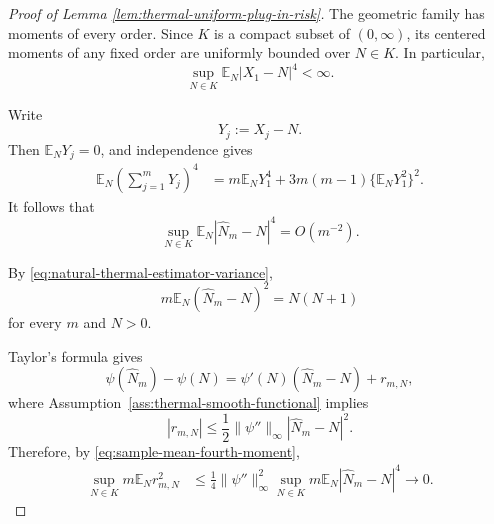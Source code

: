 \documentclass{article}
\theoremstyle{named}
\theoremstyle{named1}
\newcommand{\E}{\mathbb{E}}
\theoremstyle{plain}
\theoremstyle{remark}
\begin{document}
\begin{proof}[Proof of Lemma \ref{lem:thermal-uniform-plug-in-risk}]
The geometric family has moments of every order.
Since \(K\) is a compact subset of \((0,\infty)\), its centered moments of any fixed order are
uniformly bounded over \(N\in K\). In particular,
\begin{equation}
    \sup_{N\in K}
    \E_N|X_1-N|^4
    <
    \infty.
    \label{eq:uniform-geometric-fourth-moment}
\end{equation}

Write
\[
    Y_j:=X_j-N.
\]
Then \(\E_NY_j=0\), and independence gives
\begin{align}
    \E_N
    \left(
        \sum_{j=1}^mY_j
    \right)^4
    &=
    m\E_NY_1^4
    +
    3m(m-1)
    \{\E_NY_1^2\}^2.
    \label{eq:fourth-moment-independent-sum}
\end{align}
It follows that
\begin{equation}
    \sup_{N\in K}
    \E_N|\widehat N_m-N|^4
    =
    O(m^{-2}).
    \label{eq:sample-mean-fourth-moment}
\end{equation}

By \eqref{eq:natural-thermal-estimator-variance},
\begin{equation}
    m\E_N(\widehat N_m-N)^2
    =
    N(N+1)
    \label{eq:thermal-exact-second-moment}
\end{equation}
for every \(m\) and \(N>0\).

Taylor's formula gives
\begin{equation}
    \psi(\widehat N_m)-\psi(N)
    =
    \psi'(N)(\widehat N_m-N)
    +
    r_{m,N},
    \label{eq:thermal-functional-taylor}
\end{equation}
where Assumption~\ref{ass:thermal-smooth-functional} implies
\begin{equation}
    |r_{m,N}|
    \leq
    \frac12
    \|\psi''\|_\infty
    |\widehat N_m-N|^2.
    \label{eq:thermal-taylor-remainder-bound}
\end{equation}
Therefore, by \eqref{eq:sample-mean-fourth-moment},
\begin{align}
    \sup_{N\in K}
    m\E_Nr_{m,N}^2
    &\leq
    \frac14
    \|\psi''\|_\infty^2
    \sup_{N\in K}
    m\E_N|\widehat N_m-N|^4
    \rightarrow0.
    \label{eq:thermal-taylor-remainder-L2}
\end{align}


\end{proof}
\end{document}
